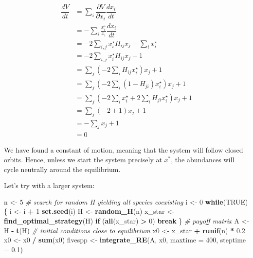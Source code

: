 \documentclass[]{book}
\newenvironment{Shaded}{\begin{snugshade}}{\end{snugshade}}
\newcommand{\CommentTok}[1]{\textcolor[rgb]{0.56,0.35,0.01}{\textit{#1}}}
\newcommand{\ControlFlowTok}[1]{\textcolor[rgb]{0.13,0.29,0.53}{\textbf{#1}}}
\newcommand{\DataTypeTok}[1]{\textcolor[rgb]{0.13,0.29,0.53}{#1}}
\newcommand{\DecValTok}[1]{\textcolor[rgb]{0.00,0.00,0.81}{#1}}
\newcommand{\FloatTok}[1]{\textcolor[rgb]{0.00,0.00,0.81}{#1}}
\newcommand{\KeywordTok}[1]{\textcolor[rgb]{0.13,0.29,0.53}{\textbf{#1}}}
\newcommand{\NormalTok}[1]{#1}
\newcommand{\OperatorTok}[1]{\textcolor[rgb]{0.81,0.36,0.00}{\textbf{#1}}}
\newcommand{\OtherTok}[1]{\textcolor[rgb]{0.56,0.35,0.01}{#1}}
\newcommand{\StringTok}[1]{\textcolor[rgb]{0.31,0.60,0.02}{#1}}
\begin{document}
\[
\begin{aligned}
  \dfrac{d V}{d t} &= \sum_i \dfrac{\partial V}{\partial x_i}
  \dfrac{d x_i}{d t}\\
  &= - \sum_i \frac{x_i^\star}{x_i} \dfrac{d x_i}{d t} \\
  &= -2 \sum_{i,j} x_i^\star H_{ij}x_j + \sum_i x_i^\star\\
  &= -2 \sum_{i,j} x_i^\star H_{ij}x_j + 1\\
  &= \sum_j \left(-2 \sum_i H_{ij}x_i^\star \right) x_j + 1\\
  &= \sum_j \left(-2 \sum_i (1 - H_{ji}) x_i^\star \right) x_j + 1\\
  &= \sum_j \left(-2 \sum_i x_i^\star + 2 \sum_i H_{ji} x_i^\star \right) x_j
  + 1 \\
  &= \sum_j \left(-2 + 1 \right) x_j  + 1 \\
  &=- \sum_j x_j + 1\\
  &= 0 
\end{aligned}
\]

We have found a constant of motion, meaning that the system will follow closed orbits. Hence, unless we start the system precisely at \(x^\ast\), the abundances will cycle neutrally around the equilibrium.

Let's try with a larger system:

\begin{Shaded}
\begin{Highlighting}[]
\NormalTok{n <-}\StringTok{ }\DecValTok{5}
\CommentTok{# search for random H yielding all species coexisting}
\NormalTok{i <-}\StringTok{ }\DecValTok{0}
\ControlFlowTok{while}\NormalTok{(}\OtherTok{TRUE}\NormalTok{)\{}
\NormalTok{  i <-}\StringTok{ }\NormalTok{i }\OperatorTok{+}\StringTok{ }\DecValTok{1}
  \KeywordTok{set.seed}\NormalTok{(i)}
\NormalTok{  H <-}\StringTok{ }\KeywordTok{random_H}\NormalTok{(n)}
\NormalTok{  x_star <-}\StringTok{ }\KeywordTok{find_optimal_strategy}\NormalTok{(H)}
  \ControlFlowTok{if}\NormalTok{ (}\KeywordTok{all}\NormalTok{(x_star) }\OperatorTok{>}\StringTok{ }\DecValTok{0}\NormalTok{) }\ControlFlowTok{break}
\NormalTok{\}}
\CommentTok{# payoff matrix}
\NormalTok{A <-}\StringTok{ }\NormalTok{H }\OperatorTok{-}\StringTok{ }\KeywordTok{t}\NormalTok{(H)}
\CommentTok{# initial conditions close to equilibrium}
\NormalTok{x0 <-}\StringTok{ }\NormalTok{x_star }\OperatorTok{+}\StringTok{ }\KeywordTok{runif}\NormalTok{(n) }\OperatorTok{*}\StringTok{ }\FloatTok{0.2}
\NormalTok{x0 <-}\StringTok{ }\NormalTok{x0 }\OperatorTok{/}\StringTok{ }\KeywordTok{sum}\NormalTok{(x0)}
\NormalTok{fivespp <-}\StringTok{ }\KeywordTok{integrate_RE}\NormalTok{(A, x0, }\DataTypeTok{maxtime =} \DecValTok{400}\NormalTok{, }\DataTypeTok{steptime =} \FloatTok{0.1}\NormalTok{)}
\end{Highlighting}
\end{Shaded}
\end{document}
